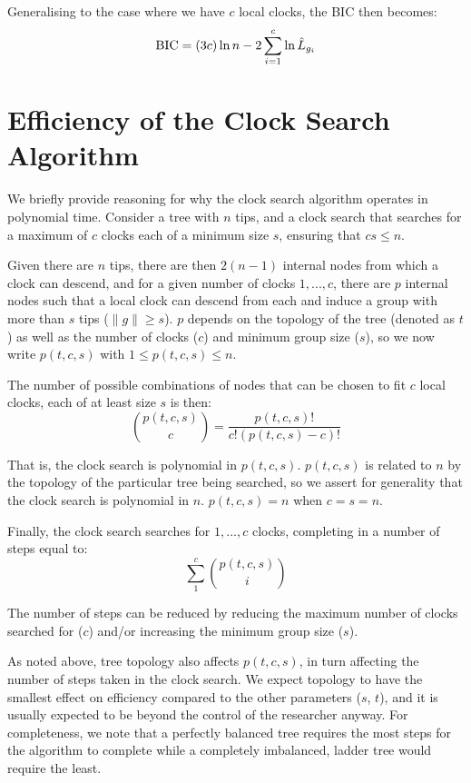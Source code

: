 \documentclass{article}
\begin{document}
Generalising to the case where we have $c$ local clocks, the BIC then becomes:
\begin{equation}
    \textnormal{BIC} = (3c)\ln{n} - 2\sum_{i=1}^{c} \ln{\hat{L}_{g_{i}}}
\end{equation}

\section{Efficiency of the Clock Search Algorithm}
We briefly provide reasoning for why the clock search algorithm operates in polynomial time.
Consider a tree with $n$ tips, and a clock search that searches for a maximum of $c$ clocks each of a minimum size $s$, ensuring that $cs \le n$.

Given there are $n$ tips, there are then $2(n-1)$ internal nodes from which a clock can descend, and for a given number of clocks $1,...,c$, there are $p$ internal nodes such that a local clock can descend from each and induce a group with more than $s$ tips ($\|g\| \ge s$). $p$ depends on the topology of the tree (denoted as $t$) as well as the number of clocks ($c$) and minimum group size ($s$), so we now write $p(t,c,s)$ with $1 \le p(t,c,s) \le n$.

The number of possible combinations of nodes that can be chosen to fit $c$ local clocks, each of at least size $s$ is then:
\begin{equation}
    \binom{p(t,c,s)}{c} = \frac{p(t,c,s)!}{c!(p(t,c,s)-c)!}
\end{equation}

That is, the clock search is polynomial in $p(t,c,s)$. $p(t,c,s)$ is related to $n$ by the topology of the particular tree being searched, so we assert for generality that the clock search is polynomial in $n$. $p(t,c,s) = n$ when $c = s = n$.

Finally, the clock search searches for $1,...,c$ clocks, completing in a number of steps equal to:
\begin{equation}
    \sum_{1}^{c} \binom{p(t,c,s)}{i}
\end{equation}

The number of steps can be reduced by reducing the maximum number of clocks searched for ($c$) and/or increasing the minimum group size ($s$).

As noted above, tree topology also affects $p(t,c,s)$, in turn affecting the number of steps taken in the clock search. We expect topology to have the smallest effect on efficiency compared to the other parameters ($s$, $t$), and it is usually expected to be beyond the control of the researcher anyway. For completeness, we note that a perfectly balanced tree requires the most steps for the algorithm to complete while a completely imbalanced, ladder tree would require the least.
\end{document}

